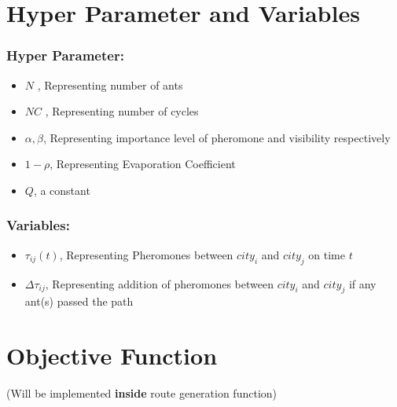 \documentclass[11pt]{article}
\providecommand{\tightlist}{%
      \setlength{\itemsep}{0pt}\setlength{\parskip}{0pt}}
\begin{document}
    \section{Hyper Parameter and
Variables}\label{hyper-parameter-and-variables}

\subsubsection{Hyper Parameter:}\label{hyper-parameter}

\begin{itemize}
\tightlist
\item
  \(N\) , Representing number of ants
\item
  \(NC\) , Representing number of cycles
\item
  \(\alpha, \beta\), Representing importance level of pheromone and
  visibility respectively
\item
  \(1-\rho\), Representing Evaporation Coefficient
\item
  \(Q\), a constant
\end{itemize}

\subsubsection{Variables:}\label{variables}

\begin{itemize}
\tightlist
\item
  \(\tau_{ij}(t)\), Representing Pheromones between \(city_i\) and
  \(city_j\) on time \(t\)
\item
  \(\Delta\tau_{ij}\), Representing addition of pheromones between
  \(city_i\) and \(city_j\) if any ant(s) passed the path
\end{itemize}

    \section{Objective Function}\label{objective-function}

(Will be implemented \textbf{inside} route generation function)
\end{document}
